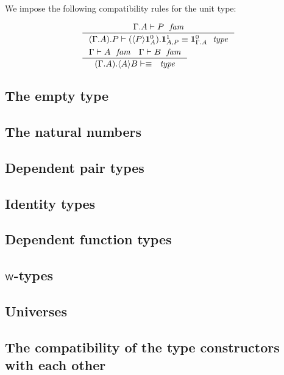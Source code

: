 We impose the following compatibility rules for the unit type:

\begin{align*}
& \inference
  {\jfam{{\Gamma}{A}}{P}}
  {\jtypeeq{{{\Gamma}{A}}{P}}{\ctxext{\ctxwk{P}{\unitc{A}}}{\unitf{A}{P}}}{\unitc{{\Gamma}{A}}}}\\
& \inference
  {\jfam{\Gamma}{A}
   \jfam{\Gamma}{B}}
  {\jtypeeq{{{\Gamma}{A}}{\ctxwk{A}{B}}}{}{}}  
\end{align*}

\subsection{The empty type}

\subsection{The natural numbers}

\subsection{Dependent pair types}

\subsection{Identity types}

\subsection{Dependent function types}

\subsection{${\mathsf{W}}$-types}

\subsection{Universes}

\subsection{The compatibility of the type constructors with each other}
\label{compatibility-of-type-constructors}

